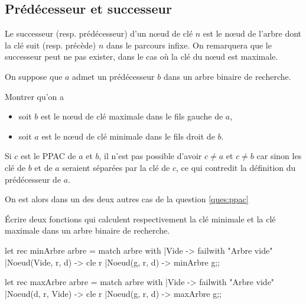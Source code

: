 \subsection{Prédécesseur et successeur}
Le successeur (resp. prédécesseur) d'un nœud de clé $n$ est le nœud de l'arbre dont la clé suit (resp. précède) $n$ dans le parcours infixe. On remarquera que le successeur peut ne pas exister, dans le cas où la clé du nœud est maximale.
\begin{question}{}{}
On suppose que $a$ admet un prédécesseur $b$ dans un arbre binaire de recherche.

Montrer qu'on a 
\begin{itemize}
    \item soit $b$ est le nœud de clé maximale dans le fils gauche de $a$,
    \item soit $a$ est le nœud de clé minimale dans le fils droit de $b$.
\end{itemize}
\reponse
Si $c$ est le PPAC de $a$ et $b$, il n'est pas possible d'avoir $c\ne a$ et $c\ne b$ car sinon les clé de $b$ et de $a$ seraient séparées par la clé de $c$, ce qui contredit la définition du prédécesseur de $a$.

On est alors dans un des deux autres cas de la question \ref{ques:ppac} 
\end{question}
\begin{question}{}{}
Écrire deux fonctions qui calculent respectivement la clé minimale et la clé maximale dans un arbre binaire de recherche. 
\reponse
\begin{ocaml}
let rec minArbre arbre = 
   match arbre with
   |Vide -> failwith "Arbre vide"
   |Noeud(Vide, r, d) -> cle r
   |Noeud(g, r, d) -> minArbre g;;

let rec maxArbre arbre = 
   match arbre with
   |Vide -> failwith "Arbre vide"
   |Noeud(d, r, Vide) -> cle r
   |Noeud(g, r, d) -> maxArbre g;;
\end{ocaml}
\end{question}
